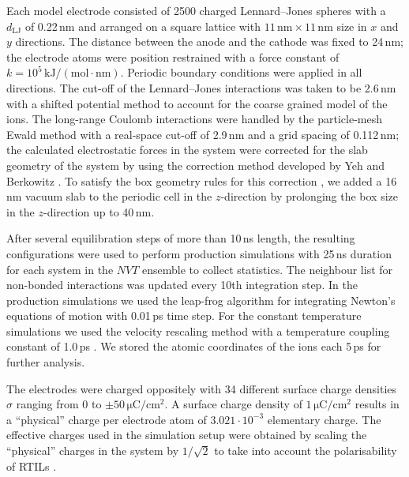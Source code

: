 \documentclass[final,5p,times,twocolumn]{elsarticle}
\begin{document}
Each model electrode consisted of 2500 charged Lennard--Jones spheres with a $d_{\mathrm{LJ}}$ of 0.22\,nm and arranged on a square lattice with $11\,\mathrm{nm}\times 11\,\mathrm{nm}$ size in $x$ and $y$ directions. The distance between the anode and the cathode was fixed to 24\,nm; the electrode atoms were position restrained with a force constant of $k=10^{5}\,\mathrm{kJ/(mol\cdot nm)}$. 
Periodic boundary conditions were applied in all directions. The cut-off of the Lennard--Jones interactions was taken to be 2.6\,nm with a shifted potential method to account for the coarse grained model of the ions. The long-range Coulomb interactions were handled by the particle-mesh Ewald method \cite{Essmann1995} with a real-space cut-off of 2.9\,nm and a grid spacing of 0.112\,nm; the calculated electrostatic forces in the system were corrected for the slab geometry of the system by using the correction method developed by Yeh and Berkowitz \cite{Yeh1999}. To satisfy the box geometry rules for this correction \cite{Yeh1999}, we added a 16\,nm vacuum slab to the periodic cell in the $z$-direction by prolonging the box size in the $z$-direction up to 40\,nm. 

After several equilibration steps of more than 10\,ns length, the resulting configurations were used to perform production simulations with 25\,ns duration for each system in the $NVT$ ensemble to collect statistics. The neighbour list for non-bonded interactions was updated every 10th integration step. In the production simulations we used the leap-frog algorithm for integrating Newton's equations of motion with 0.01\,ps time step. For the constant temperature simulations we used the velocity rescaling method with a temperature coupling constant of 1.0\,ps \cite{Bussi2007}. We stored the atomic coordinates of the ions each 5\,ps for further analysis.

The electrodes were charged oppositely with 34 different surface charge densities $\sigma$ ranging from 0 to $\pm50\,\mathrm{\mu C/cm^2}$. A surface charge density of $1\,\mathrm{\mu C/cm^2}$ results in a ``physical'' charge per electrode atom of $3.021 \cdot 10^{-3}$ elementary charge. The effective charges used in the simulation setup were obtained by scaling the ``physical'' charges in the system by $1/\sqrt2$ to take into account the polarisability of RTILs \cite{Fedorov2008a}. 
\end{document}
